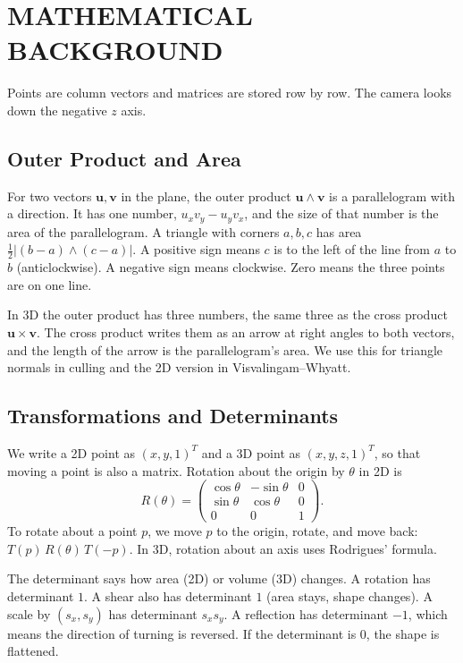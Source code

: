 \chapter{MATHEMATICAL BACKGROUND}\nonum

Points are column vectors and matrices are stored row by row. The camera looks down the negative $z$ axis.

\section{Outer Product and Area}
For two vectors $\mathbf u,\mathbf v$ in the plane, the outer product $\mathbf u\wedge\mathbf v$ is a parallelogram with a direction. It has one number, $u_xv_y-u_yv_x$, and the size of that number is the area of the parallelogram. A triangle with corners $a,b,c$ has area $\tfrac12\lvert(b-a)\wedge(c-a)\rvert$. A positive sign means $c$ is to the left of the line from $a$ to $b$ (anticlockwise). A negative sign means clockwise. Zero means the three points are on one line.

In 3D the outer product has three numbers, the same three as the cross product $\mathbf u\times\mathbf v$. The cross product writes them as an arrow at right angles to both vectors, and the length of the arrow is the parallelogram's area. We use this for triangle normals in culling and the 2D version in Visvalingam--Whyatt.

\section{Transformations and Determinants}
We write a 2D point as $(x,y,1)^T$ and a 3D point as $(x,y,z,1)^T$, so that moving a point is also a matrix. Rotation about the origin by $\theta$ in 2D is
\[
R(\theta)=\begin{pmatrix}\cos\theta&-\sin\theta&0\\ \sin\theta&\cos\theta&0\\0&0&1\end{pmatrix}.
\]
To rotate about a point $p$, we move $p$ to the origin, rotate, and move back: $T(p)\,R(\theta)\,T(-p)$. In 3D, rotation about an axis uses Rodrigues' formula.

The determinant says how area (2D) or volume (3D) changes. A rotation has determinant $1$. A shear also has determinant $1$ (area stays, shape changes). A scale by $(s_x,s_y)$ has determinant $s_xs_y$. A reflection has determinant $-1$, which means the direction of turning is reversed. If the determinant is $0$, the shape is flattened.

